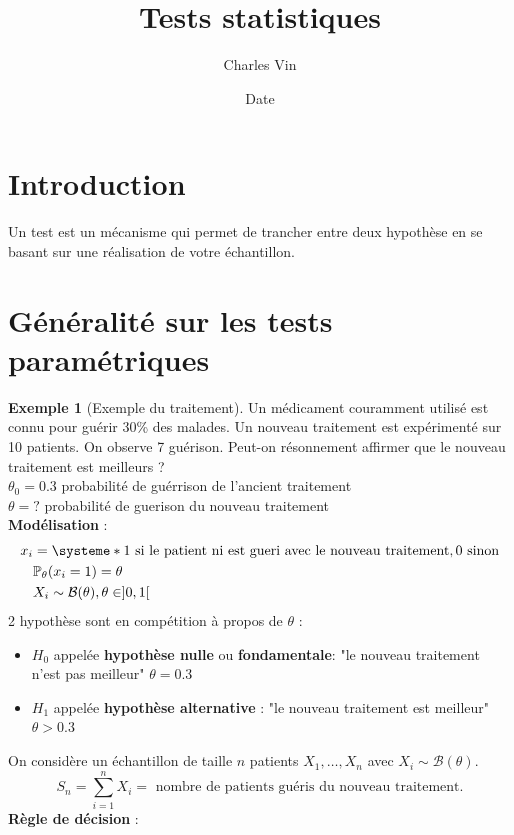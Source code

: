 \documentclass{article}
\title{Tests statistiques}
\author{Charles Vin}
\date{Date}
\theoremstyle{plain}%
\theoremstyle{definition}
\newtheorem{exmp}{Exemple}[section]
\theoremstyle{remark}
\begin{document}
\maketitle

\section{Introduction}
Un test est un mécanisme qui permet de trancher entre deux hypothèse en se basant sur une réalisation de votre échantillon.


\section{Généralité sur les tests paramétriques}
\begin{exmp}[Exemple du traitement]
    Un médicament couramment utilisé est connu pour guérir 30\% des malades. Un nouveau traitement est expérimenté sur 10 patients. On observe 7 guérison. Peut-on résonnement affirmer que le nouveau traitement est meilleurs ? \\
    $ \theta _0 = 0.3 $ probabilité de guérrison de l'ancient traitement \\
    $ \theta = ?$ probabilité de guerison du nouveau traitement \\
    \textbf{Modélisation} : \begin{align*}
        x_i &= \systeme*{
            1 \text{ si le patient ni est gueri avec le nouveau traitement},
            0 \text{ sinon}
        } \\
        &\mathbb{P}_\theta (x_i =1) = \theta \\
        &X_i \sim \mathcal{B}(\theta ) , \theta \in ]0,1[
    \end{align*}
    2 hypothèse sont en compétition à propos de $ \theta $ : \begin{itemize}
        \item $ H_0 $ appelée \textbf{hypothèse nulle} ou \textbf{fondamentale}: "le nouveau traitement n'est pas meilleur" $ \theta = 0.3 $ 
        \item $ H_1 $ appelée \textbf{hypothèse alternative} : "le nouveau traitement est meilleur" $ \theta > 0.3 $ 
    \end{itemize}
    On considère un échantillon de taille $ n $ patients $ X_1, \dots, X_n $ avec $ X_i \sim \mathcal{B}(\theta ) $. 
    \[
        S_n = \sum_{i=1}^{n}X_i = \text{ nombre de patients guéris du nouveau traitement}
    .\]
    \textbf{Règle de décision} : \begin{itemize}

\end{itemize}
\end{exmp}
\end{document}
